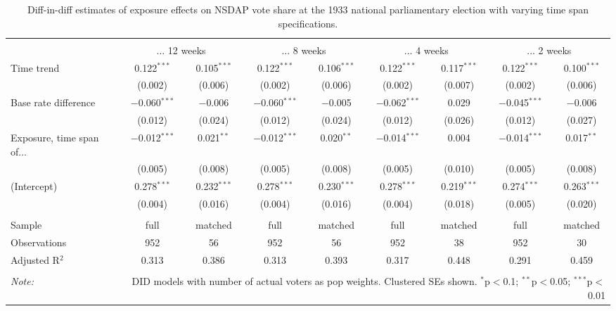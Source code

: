 
\begin{table}[!htbp] \centering 
  \caption{Diff-in-diff estimates of exposure effects on NSDAP vote share at the 1933 national parliamentary election with varying time span specifications.\vspace{-.25cm}} 
  \label{tab:nsdap-voteshare-timespan-dd-1933} 
\scriptsize 
\begin{tabular}{@{\extracolsep{5pt}}lcccccccc} 
\\[-1.8ex]\hline 
\hline \\[-1.8ex] 
 & \multicolumn{2}{c}{... 12 weeks} & \multicolumn{2}{c}{... 8 weeks} & \multicolumn{2}{c}{... 4 weeks} & \multicolumn{2}{c}{... 2 weeks} \\ 
 \cmidrule(r){2-3}\cmidrule(r){4-5}\cmidrule(r){6-7}\cmidrule(r){8-9}Time trend & 0.122$^{***}$ & 0.105$^{***}$ & 0.122$^{***}$ & 0.106$^{***}$ & 0.122$^{***}$ & 0.117$^{***}$ & 0.122$^{***}$ & 0.100$^{***}$ \\ 
  & (0.002) & (0.006) & (0.002) & (0.006) & (0.002) & (0.007) & (0.002) & (0.006) \\ 
  Base rate difference & $-$0.060$^{***}$ & $-$0.006 & $-$0.060$^{***}$ & $-$0.005 & $-$0.062$^{***}$ & 0.029 & $-$0.045$^{***}$ & $-$0.006 \\ 
  & (0.012) & (0.024) & (0.012) & (0.024) & (0.012) & (0.026) & (0.012) & (0.027) \\ 
  Exposure, time span of... & $-$0.012$^{***}$ & 0.021$^{**}$ & $-$0.012$^{***}$ & 0.020$^{**}$ & $-$0.014$^{***}$ & 0.004 & $-$0.014$^{***}$ & 0.017$^{**}$ \\ 
  & (0.005) & (0.008) & (0.005) & (0.008) & (0.005) & (0.010) & (0.005) & (0.008) \\ 
  (Intercept) & 0.278$^{***}$ & 0.232$^{***}$ & 0.278$^{***}$ & 0.230$^{***}$ & 0.278$^{***}$ & 0.219$^{***}$ & 0.274$^{***}$ & 0.263$^{***}$ \\ 
  & (0.004) & (0.016) & (0.004) & (0.016) & (0.004) & (0.018) & (0.005) & (0.020) \\ 
 \hline \\[-1.8ex] 
Sample & full & matched & full & matched & full & matched & full & matched \\ 
Observations & 952 & 56 & 952 & 56 & 952 & 38 & 952 & 30 \\ 
Adjusted R$^{2}$ & 0.313 & 0.386 & 0.313 & 0.393 & 0.317 & 0.448 & 0.291 & 0.459 \\ 
\hline 
\hline \\[-1.8ex] 
\textit{Note:}  & \multicolumn{8}{r}{DID models with number of actual voters as pop weights. Clustered SEs shown. $^{*}$p$<$0.1; $^{**}$p$<$0.05; $^{***}$p$<$0.01} \\ 
\end{tabular} 
\end{table} 
